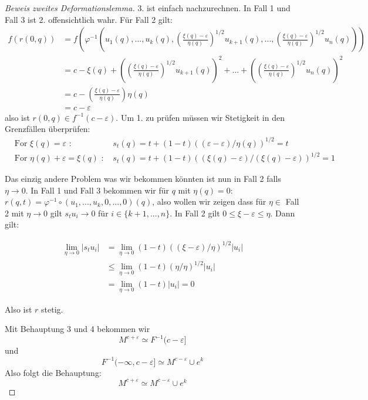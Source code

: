 \begin{proof}[Beweis zweites Deformationslemma]
    3. ist einfach nachzurechnen. In Fall 1 und Fall 3 ist 2. offensichtlich
    wahr. Für Fall 2 gilt:
    \begin{align*} 
        f(r(0, q)) & = 
            f\left( \varphi^{-1} \left(u_1(q), ..., u_k(q), 
            \left( \frac{\xi(q) - \varepsilon}{\eta(q)} \right)^{1/2}u_{k + 1}(q), ...,
            \left( \frac{\xi(q) - \varepsilon}{\eta(q)} \right)^{1/2}u_n(q)
            \right)
            \right) \\
        & = c - \xi(q)
            + \left( \left( \frac{\xi(q) - \varepsilon}{\eta(q)} \right)^{1/2}u_{k + 1}(q) \right)^2 + ... 
            + \left( \left( \frac{\xi(q) - \varepsilon}{\eta(q)} \right)^{1/2}u_n(q) \right)^2 \\
        & = c - \left( \frac{\xi(q) - \varepsilon}{\eta(q)} \right) \eta(q) \\
        & = c - \varepsilon
    \end{align*}
    also ist $r(0, q) \in f^{-1}(c - \varepsilon)$. Um 1. zu prüfen müssen wir 
    Stetigkeit in den Grenzfällen überprüfen:
    \begin{align*}
        & \text{For } \xi(q) = \varepsilon \text{ : }
            & s_t(q)  =t + (1 - t)((\varepsilon - \varepsilon)/\eta(q))^{1/2} = t \\
        & \text{For } \eta(q) + \varepsilon = \xi(q) \text{ : }
            & s_t(q) = t + (1 - t)((\xi(q) - \varepsilon)/(\xi(q) - \varepsilon))^{1/2} = 1
    \end{align*}

    Das einzig andere Problem was wir bekommen könnten ist nun in Fall 2 falls
    $\eta \to 0$. In Fall 1 und Fall 3 bekommen wir für $q$ mit $\eta(q) = 0$:
    $r(q, t) = \varphi^{-1} \circ (u_1, ..., u_k, 0, ..., 0)(q)$, also wollen
    wir zeigen dass für $\eta \in $ Fall 2 mit $\eta \to 0$ gilt $s_tu_i \to 0$
    für $i \in \{k+1, ..., n\}$. In Fall 2 gilt
    $0 \leq \xi - \varepsilon \leq \eta$. Dann gilt:

    \begin{align*}
        \lim\limits_{\eta \to 0} | s_t u_i |
           & = \lim\limits_{\eta \to 0} (1 - t)((\xi - \varepsilon)/\eta)^{1/2} | u_i | \\
           & \leq \lim\limits_{\eta \to 0} (1 - t)(\eta/\eta)^{1/2}|u_i| \\
           & = \lim\limits_{\eta \to 0} (1 - t)|u_i| = 0 
    \end{align*}
    
    Also ist $r$ stetig.
    \sectiondone

    Mit Behauptung 3 und 4 bekommen wir
    \[ M^{c + \varepsilon} \simeq F^{-1}(c - \varepsilon] \]
    und 
    \[ F^{-1}(-\infty, c - \varepsilon] \simeq M^{c - \varepsilon} \cup e^k \]
    Also folgt die Behauptung:
    \[ M^{c + \varepsilon} \simeq M^{c - \varepsilon} \cup e^k \]

\end{proof}

